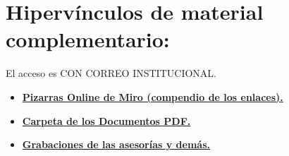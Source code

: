 \documentclass[letterpaper, 12pt]{article}
\begin{document}
        \section*{Hipervínculos de material complementario:}
        El acceso es CON CORREO INSTITUCIONAL.
        \begin{itemize}
            \item \href{https://docs.google.com/document/d/1mhFr7S5rJ7TwR297Kd6l8b6NPvYkUAlpWIxuz4VKV2w/edit?usp=sharing}{\textbf{Pizarras Online de Miro (compendio de los enlaces).}}
            \item \href{https://drive.google.com/drive/folders/1yL1gAIbVpgKB3h8498KFNE7NDZjoxIWa?usp=sharing}{\textbf{Carpeta de los Documentos PDF.}}
            \item \href{https://drive.google.com/drive/folders/1TPtNSe4ErSgaBLw2kgYDQadyXqvh6AYC?usp=sharing}{\textbf{Grabaciones de las asesorías y demás.}}
        \end{itemize}
\end{document}
